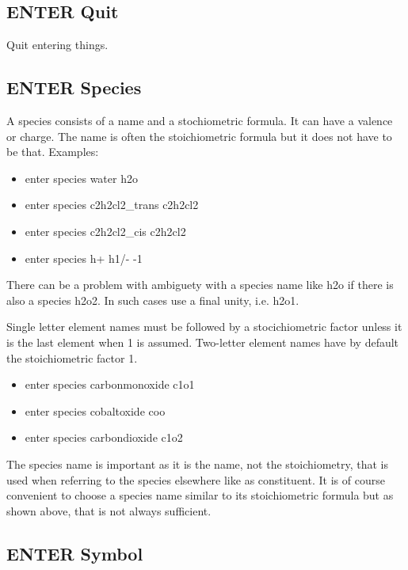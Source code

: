 \documentclass[12pt]{article}
\begin{document}
\subsection{ENTER Quit}

Quit entering things.

\subsection{ENTER Species}

A species consists of a name and a stochiometric formula.  It can have
a valence or charge.  The name is often the stoichiometric formula
but it does not have to be that.  Examples:

\begin{itemize}
\item enter species water h2o
\item enter species c2h2cl2\_trans c2h2cl2
\item enter species c2h2cl2\_cis c2h2cl2
\item enter species h+ h1/- -1
\end{itemize}

There can be a problem with ambiguety with a species name like h2o if
there is also a species h2o2.  In such cases use a final unity, i.e.
h2o1.

Single letter element names must be followed by a stocichiometric
factor unless it is the last element when 1 is assumed.  Two-letter
element names have by default the stoichiometric factor 1.

\begin{itemize}
\item enter species carbonmonoxide c1o1
\item enter species cobaltoxide coo
\item enter species carbondioxide c1o2
\end{itemize}

The species name is important as it is the name, not the
stoichiometry, that is used when referring to the species elsewhere
like as constituent.  It is of course convenient to choose a species
name similar to its stoichiometric formula but as shown above, that is
not always sufficient.

\subsection{ENTER Symbol}
\end{document}
